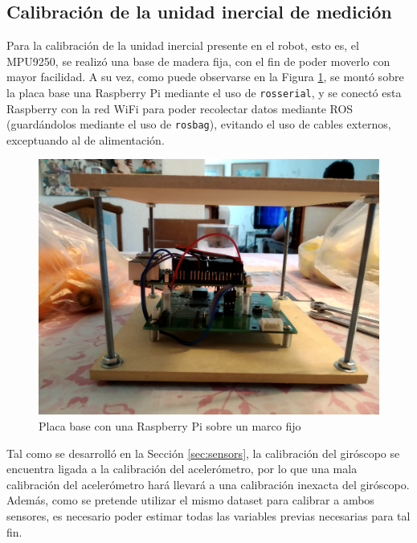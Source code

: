 \subsection{Calibración de la unidad inercial de medición}
Para la calibración de la unidad inercial presente en el robot, esto es, el MPU9250, se realizó una base de madera fija, con el fin de poder moverlo con mayor facilidad. A su vez, como puede observarse en la Figura \ref{fig:baseboardimucalibrationwithframe}, se montó sobre la placa base una Raspberry Pi mediante el uso de \texttt{rosserial}, y se conectó esta Raspberry con la red WiFi para poder recolectar datos mediante ROS (guardándolos mediante el uso de \texttt{rosbag}), evitando el uso de cables externos, exceptuando al de alimentación.
\begin{figure}
    \centering
    \includegraphics[width=\textwidth]{Img/BaseBoardIMUCalibrationWithFrame.jpg}
    \caption{Placa base con una Raspberry Pi sobre un marco fijo}
    \label{fig:baseboardimucalibrationwithframe}
\end{figure}


Tal como se desarrolló en la Sección \ref{sec:sensors}, la calibración del giróscopo se encuentra ligada a la calibración del acelerómetro, por lo que una mala calibración del acelerómetro hará llevará a una calibración inexacta del giróscopo. Además, como se pretende utilizar el mismo dataset para calibrar a ambos sensores, es necesario poder estimar todas las variables previas necesarias para tal fin.

